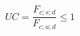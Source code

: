 \documentclass[12pt]{article}
\begin{document}
\begin{displaymath}
UC = \frac {F_{c;s;d}} {F_{c;u;d}} \leq 1
\end{displaymath}
\end{document}
